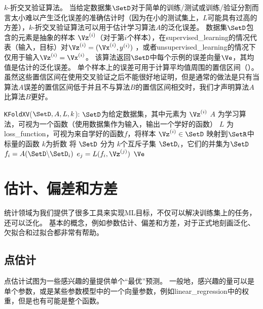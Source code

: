 \begin{algorithm}
  \caption{$k$-折交叉验证算法。
当给定数据集$\SetD$对于简单的训练/测试或训练/验证分割而言太小难以产生泛化误差的准确估计时（因为在小的测试集上，$L$可能具有过高的方差），$k$-折交叉验证算法可以用于估计学习算法$A$的泛化误差。
数据集$\SetD$包含的元素是抽象的样本 $\Vz^{(i)}$（对于第$i$个样本），在\gls{supervised_learning}的情况代表（输入，目标）对$\Vz^{(i)} = (\Vx^{(i)}, y^{(i)})$ ，或者\gls{unsupervised_learning}的情况下仅用于输入$\Vz^{(i)} = \Vx^{(i)}$。
该算法返回$\SetD$中每个示例的误差向量$\Ve$，其均值是估计的泛化误差。
单个样本上的误差可用于计算平均值周围的置信区间（）。
虽然这些置信区间在使用交叉验证之后不能很好地证明，但是通常的做法是只有当算法$A$误差的置信区间低于并且不与算法$B$的置信区间相交时，我们才声明算法$A$比算法$B$更好。}
\label{alg:xv}
\begin{algorithmic}
\item[] \hspace*{-4.2mm}{\bf Define} {\tt KFoldXV}($\SetD,A,L,k$):
\REQUIRE $\SetD$为给定数据集，其中元素为 $\Vz^{(i)}$
\REQUIRE $A$ 为学习算法，可视为一个函数（使用数据集作为输入，输出一个学好的函数）
\REQUIRE $L$ 为\gls{loss_function}，可视为来自学好的函数$f$，将样本 $\Vz^{(i)} \in \SetD$ 映射到$\SetR$中标量的函数
\REQUIRE $k$为折数
\STATE 将 $\SetD$ 分为 $k$个互斥子集 $\SetD_i$，它们的并集为$\SetD$
  \STATE $f_i = A(\SetD \backslash \SetD_i)$ 
    \STATE $e_j = L(f_i, \Vz^{(j)})$
  \ENDFOR
\ENDFOR
{} $\Ve$
\end{algorithmic}
\end{algorithm}

\section{估计、偏差和方差}
\label{sec:estimators_bias_and_variance}
统计领域为我们提供了很多工具来实现\gls{ML}目标，不仅可以解决训练集上的任务，还可以泛化。
基本的概念，例如参数估计、偏差和方差，对于正式地刻画泛化、欠拟合和过拟合都非常有帮助。

\subsection{点估计}
\label{sec:point_estimation}
点估计试图为一些感兴趣的量提供单个``最优''预测。
一般地，感兴趣的量可以是单个参数，或是某些参数模型中的一个向量参数，例如\gls{linear_regression}中的权重，但是也有可能是整个函数。

